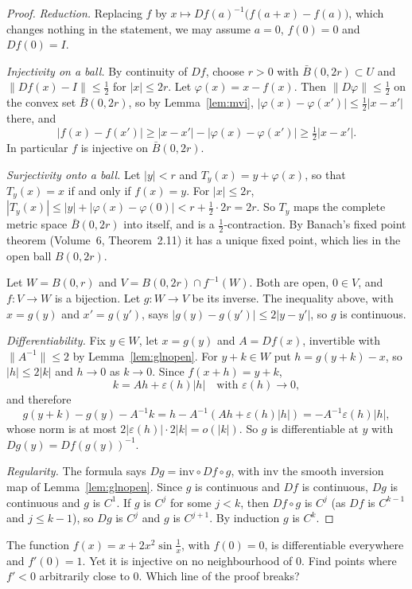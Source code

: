 \begin{proof}
\emph{Reduction.} Replacing $f$ by $x\mapsto Df(a)^{-1}\bigl(f(a+x)-f(a)\bigr)$, which changes nothing in the statement, we may assume $a=0$,
$f(0)=0$ and $Df(0)=I$.

\emph{Injectivity on a ball.} By continuity of $Df$, choose $r>0$ with $\bar B(0,2r)\subset U$ and $\|Df(x)-I\|\le\frac12$ for $|x|\le2r$. Let
$\varphi(x)=x-f(x)$. Then $\|D\varphi\|\le\frac12$ on the convex set $\bar B(0,2r)$, so by Lemma~\ref{lem:mvi}, $|\varphi(x)-\varphi(x')|\le\frac12|x-x'|$ there,
and
\[
|f(x)-f(x')|\ge|x-x'|-|\varphi(x)-\varphi(x')|\ge\tfrac12|x-x'|.
\]
In particular $f$ is injective on $\bar B(0,2r)$.

\emph{Surjectivity onto a ball.} Let $|y|<r$ and $T_y(x)=y+\varphi(x)$, so that $T_y(x)=x$ if and only if $f(x)=y$. For $|x|\le2r$,
$|T_y(x)|\le|y|+|\varphi(x)-\varphi(0)|<r+\frac12\cdot2r=2r$. So $T_y$ maps the complete metric space $\bar B(0,2r)$ into itself, and is a
$\frac12$-contraction. By Banach's fixed point theorem (Volume~6, Theorem~2.11) it has a unique fixed point, which lies in the open ball $B(0,2r)$.

Let $W=B(0,r)$ and $V=B(0,2r)\cap f^{-1}(W)$. Both are open, $0\in V$, and $f\colon V\to W$ is a bijection. Let $g\colon W\to V$ be its inverse. The
inequality above, with $x=g(y)$ and $x'=g(y')$, says $|g(y)-g(y')|\le2|y-y'|$, so $g$ is continuous.

\emph{Differentiability.} Fix $y\in W$, let $x=g(y)$ and $A=Df(x)$, invertible with $\|A^{-1}\|\le2$ by Lemma~\ref{lem:glnopen}. For $y+k\in W$ put
$h=g(y+k)-x$, so $|h|\le2|k|$ and $h\to0$ as $k\to0$. Since $f(x+h)=y+k$,
\[
k=Ah+\varepsilon(h)|h|\quad\text{with }\varepsilon(h)\to0,
\]
and therefore
\[
g(y+k)-g(y)-A^{-1}k=h-A^{-1}(Ah+\varepsilon(h)|h|)=-A^{-1}\varepsilon(h)|h|,
\]
whose norm is at most $2|\varepsilon(h)|\cdot2|k|=o(|k|)$. So $g$ is differentiable at $y$ with $Dg(y)=Df(g(y))^{-1}$.

\emph{Regularity.} The formula says $Dg=\mathrm{inv}\circ Df\circ g$, with $\mathrm{inv}$ the smooth inversion map of Lemma~\ref{lem:glnopen}. Since $g$
is continuous and $Df$ is continuous, $Dg$ is continuous and $g$ is $C^1$. If $g$ is $C^j$ for some $j<k$, then $Df\circ g$ is $C^{j}$ (as $Df$ is
$C^{k-1}$ and $j\le k-1$), so $Dg$ is $C^j$ and $g$ is $C^{j+1}$. By induction $g$ is $C^k$.
\end{proof}

\begin{think}
The function $f(x)=x+2x^2\sin\frac1x$, with $f(0)=0$, is differentiable everywhere and $f'(0)=1$. Yet it is injective on no neighbourhood of $0$. Find
points where $f'<0$ arbitrarily close to $0$. Which line of the proof breaks?
\end{think}

